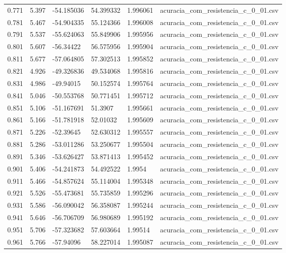 \begin{table}
\begin{tabular}{llllll}
0.771 & 5.397 & -54.185036 & 54.399332 & 1.996061 & acuracia\_com\_resistencia\_c\_0\_01.csv \\
0.781 & 5.467 & -54.904335 & 55.124366 & 1.996008 & acuracia\_com\_resistencia\_c\_0\_01.csv \\
0.791 & 5.537 & -55.624063 & 55.849906 & 1.995956 & acuracia\_com\_resistencia\_c\_0\_01.csv \\
0.801 & 5.607 & -56.34422 & 56.575956 & 1.995904 & acuracia\_com\_resistencia\_c\_0\_01.csv \\
0.811 & 5.677 & -57.064805 & 57.302513 & 1.995852 & acuracia\_com\_resistencia\_c\_0\_01.csv \\
0.821 & 4.926 & -49.326836 & 49.534068 & 1.995816 & acuracia\_com\_resistencia\_c\_0\_01.csv \\
0.831 & 4.986 & -49.94015 & 50.152574 & 1.995764 & acuracia\_com\_resistencia\_c\_0\_01.csv \\
0.841 & 5.046 & -50.553768 & 50.771451 & 1.995712 & acuracia\_com\_resistencia\_c\_0\_01.csv \\
0.851 & 5.106 & -51.167691 & 51.3907 & 1.995661 & acuracia\_com\_resistencia\_c\_0\_01.csv \\
0.861 & 5.166 & -51.781918 & 52.01032 & 1.995609 & acuracia\_com\_resistencia\_c\_0\_01.csv \\
0.871 & 5.226 & -52.39645 & 52.630312 & 1.995557 & acuracia\_com\_resistencia\_c\_0\_01.csv \\
0.881 & 5.286 & -53.011286 & 53.250677 & 1.995504 & acuracia\_com\_resistencia\_c\_0\_01.csv \\
0.891 & 5.346 & -53.626427 & 53.871413 & 1.995452 & acuracia\_com\_resistencia\_c\_0\_01.csv \\
0.901 & 5.406 & -54.241873 & 54.492522 & 1.9954 & acuracia\_com\_resistencia\_c\_0\_01.csv \\
0.911 & 5.466 & -54.857624 & 55.114004 & 1.995348 & acuracia\_com\_resistencia\_c\_0\_01.csv \\
0.921 & 5.526 & -55.473681 & 55.735859 & 1.995296 & acuracia\_com\_resistencia\_c\_0\_01.csv \\
0.931 & 5.586 & -56.090042 & 56.358087 & 1.995244 & acuracia\_com\_resistencia\_c\_0\_01.csv \\
0.941 & 5.646 & -56.706709 & 56.980689 & 1.995192 & acuracia\_com\_resistencia\_c\_0\_01.csv \\
0.951 & 5.706 & -57.323682 & 57.603664 & 1.99514 & acuracia\_com\_resistencia\_c\_0\_01.csv \\
0.961 & 5.766 & -57.94096 & 58.227014 & 1.995087 & acuracia\_com\_resistencia\_c\_0\_01.csv \\

\end{tabular}
\end{table}
